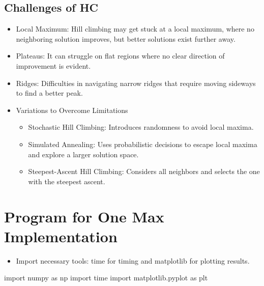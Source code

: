 \documentclass[
  letterpaper,
  DIV=11,
  numbers=noendperiod]{scrreprt}
\newenvironment{Shaded}{\begin{snugshade}}{\end{snugshade}}
\newcommand{\ImportTok}[1]{\textcolor[rgb]{0.00,0.46,0.62}{#1}}
\newcommand{\NormalTok}[1]{\textcolor[rgb]{0.00,0.23,0.31}{#1}}
\providecommand{\tightlist}{%
  \setlength{\itemsep}{0pt}\setlength{\parskip}{0pt}}\usepackage{longtable,booktabs,array}
\begin{document}
\section{Challenges of HC}\label{challenges-of-hc}

\begin{itemize}
\item
  Local Maximum: Hill climbing may get stuck at a local maximum, where
  no neighboring solution improves, but better solutions exist further
  away.
\item
  Plateaus: It can struggle on flat regions where no clear direction of
  improvement is evident.
\item
  Ridges: Difficulties in navigating narrow ridges that require moving
  sideways to find a better peak.
\item
  Variations to Overcome Limitations

  \begin{itemize}
  \tightlist
  \item
    Stochastic Hill Climbing: Introduces randomness to avoid local
    maxima.
  \item
    Simulated Annealing: Uses probabilistic decisions to escape local
    maxima and explore a larger solution space.
  \item
    Steepest-Ascent Hill Climbing: Considers all neighbors and selects
    the one with the steepest ascent.
  \end{itemize}
\end{itemize}


\chapter{Program for One Max
Implementation}\label{program-for-one-max-implementation}

\begin{itemize}
\tightlist
\item
  Import necessary tools: time for timing and matplotlib for plotting
  results.
\end{itemize}

\begin{Shaded}
\begin{Highlighting}[]
\ImportTok{import}\NormalTok{ numpy }\ImportTok{as}\NormalTok{ np}
\ImportTok{import}\NormalTok{ time}
\ImportTok{import}\NormalTok{ matplotlib.pyplot }\ImportTok{as}\NormalTok{ plt}
\end{Highlighting}
\end{Shaded}
\end{document}
